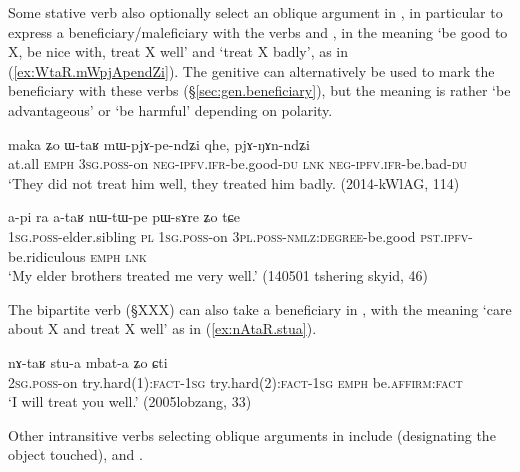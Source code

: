 Some stative verb also optionally select an oblique argument in , in particular to express a beneficiary/maleficiary with the verbs  and , in the meaning `be good to X, be nice with, treat X well' and `treat X badly', as in (\ref{ex:WtaR.mWpjApendZi}). The genitive can alternatively be used to mark the beneficiary with these verbs (§\ref{sec:gen.beneficiary}), but the meaning is rather `be advantageous' or `be harmful' depending on polarity.


\begin{exe}
\ex \label{ex:WtaR.mWpjApendZi}
\gll  maka ʑo ɯ-taʁ mɯ-pjɤ-pe-ndʑi qhe, pjɤ-ŋɤn-ndʑi \\
at.all \textsc{emph} \textsc{3sg}.\textsc{poss}-on \textsc{neg}-\textsc{ipfv}.\textsc{ifr}-be.good-\textsc{du} \textsc{lnk} \textsc{neg}-\textsc{ipfv}.\textsc{ifr}-be.bad-\textsc{du} \\
\glt `They did not treat him well, they treated him badly. (2014-kWlAG, 114)
\end{exe}

\begin{exe}
\ex \label{ex:ataR.nWtWpe}
\gll  a-pi ra a-taʁ nɯ-tɯ-pe pɯ-sɤre ʑo tɕe  \\
\textsc{1sg}.\textsc{poss}-elder.sibling \textsc{pl} \textsc{1sg}.\textsc{poss}-on \textsc{3pl}.\textsc{poss}-\textsc{nmlz}:\textsc{degree}-be.good \textsc{pst}.\textsc{ipfv}-be.ridiculous \textsc{emph} \textsc{lnk} \\
\glt `My elder brothers treated me very well.' (140501 tshering skyid, 46)
\end{exe}

The bipartite verb  (§XXX) can also take a beneficiary in , with the meaning `care about X and treat X well' as in (\ref{ex:nAtaR.stua}).

\begin{exe}
\ex \label{ex:nAtaR.stua}
\gll nɤ-taʁ stu-a mbat-a ʑo ɕti \\
\textsc{2sg}.\textsc{poss}-on try.hard(1):\textsc{fact}-\textsc{1sg} try.hard(2):\textsc{fact}-\textsc{1sg} \textsc{emph} be.\textsc{affirm}:\textsc{fact} \\
\glt `I will treat you well.' (2005lobzang, 33)
\end{exe}
Other intransitive verbs selecting oblique arguments in  include  (designating the object touched),  and .

